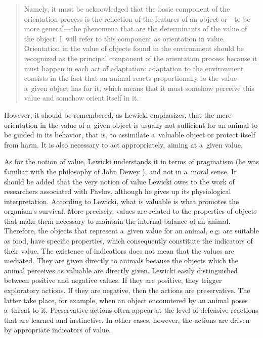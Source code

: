 \documentclass[%
manuscript=article,
year=2024,
volume=77,
doi=10.59203/zfn.77.693,
]{zfn}
\begin{document}
\begin{quote}
Namely, it must be acknowledged that the basic component of the orientation process is the reflection of the features of an object or---to be more general---the phenomena that are the determinants of the value of the object. I~will refer to this component as orientation in value. Orientation in the value of objects found in the environment should be recognized as the principal component of the orientation process because it must happen in each act of adaptation: adaptation to the environment consists in the fact that an animal reacts proportionally to the value a~given object has for it, which means that it must somehow perceive this value and somehow orient itself in it. 
\parencite[][p.48]{lewicki_cognition_2016}%
\end{quote}




However, it should be remembered, as Lewicki emphasizes, that the mere orientation in the value of a~given object is usually not sufficient for an animal to be guided in its behavior, that is, to assimilate a~valuable object or protect itself from harm. It is also necessary to act appropriately, aiming at a~given value.



As for the notion of value, Lewicki understands it in terms of pragmatism (he was familiar with the philosophy of John Dewey 
\parencite[cf.][p.234]{lewicki_procesy_1960}%
), and not in a~moral sense. It should be added that the very notion of value Lewicki owes to the work of researchers associated with Pavlov, although he gives up its physiological interpretation. According to Lewicki, what is valuable is what promotes the organism's survival. More precisely, values are related to the properties of objects that make them necessary to maintain the internal balance of an animal. Therefore, the objects that represent a~given value for an animal, e.g. are suitable as food, have specific properties, which consequently constitute the indicators of their value. The existence of indicatiors does not mean that the values are mediated. They are given directly to animals because the objects which the animal perceives as valuable are directly given. Lewicki easily distinguished between positive and negative values. If they are positive, they trigger exploratory actions. If they are negative, then the actions are preservative. The latter take place, for example, when an object encountered by an animal poses a~threat to it. Preservative actions often appear at the level of defensive reactions that are learned and instinctive. In other cases, however, the actions are driven by appropriate indicators of value.
\end{document}
